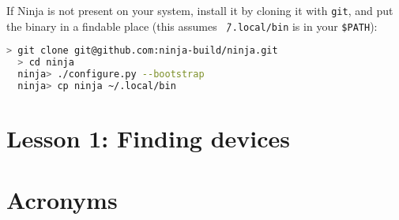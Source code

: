 \documentclass{article}
\begin{document}
  If Ninja is not present on your system, install it by cloning it with {\tt git}, and put the binary in a findable place (this assumes {\tt \~\ /.local/bin} is in your {\tt \$PATH}):

  \begin{lstlisting}[language=bash]
  > git clone git@github.com:ninja-build/ninja.git
  > cd ninja
  ninja> ./configure.py --bootstrap
  ninja> cp ninja ~/.local/bin
  \end{lstlisting}

  \section{Lesson 1: Finding devices}

  \section{Acronyms}
  \begin{acronym}
  \end{acronym}
\end{document}
